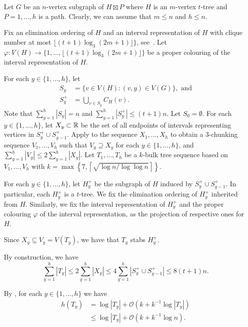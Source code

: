 \documentclass[kpfonts]{patmorin}
\newcommand{\Oh}{\mathcal{O}}
\let\le\leqslant
\let\leq\leqslant
\begin{document}
Let $G$ be an $n$-vertex subgraph of $H\boxtimes P$ where $H$ is an $m$-vertex $t$-tree and $P=1,\ldots,h$ is a path. 
Clearly, we can assume that $m\leq n$ and $h\leq n$.

Fix an elimination ordering of $H$ and 
an interval representation of $H$ with clique number at most $\lfloor(t+1)\log_3 (2m+1)\rfloor\}$, see~. 
Let $\varphi:V(H)\to\{1,\ldots,\lfloor(t+1)\log_3 (2m+1)\rfloor\}$ be a proper colouring of the interval representation of $H$.

For each $y\in\{1,\ldots,h\}$, let 
\begin{align*}
S_y&=\{v\in V(H): (v,y)\in V(G)\}, \text{ and}\\
S^+_y&=\textstyle\bigcup_{v\in S_y} C_H(v).
\end{align*}
Note that $\sum_{y=1}^h |S_y| =n$ and $\sum_{y=1}^h |S^+_y| \leq (t+1)n$.
Let $S_0=\emptyset$. 
For each $y\in\{1,\ldots,h\}$, let $X_y\subset\mathbb{R}$ be the set of all endpoints of intervals representing vertices in $S^+_y\cup S^+_{y-1}$. 
Apply  to the sequence $X_1,\ldots,X_h$ to obtain a $3$-chunking sequence $V_1,\ldots,V_{h}$ such that $V_y\supseteq X_y$ for each $y\in\{1,\ldots,h\}$, and $\sum_{y=1}^h |V_y|\le 2\sum_{y=1}^h |X_y|$.
Let $T_1,\ldots,T_h$ be a $k$-bulk tree sequence based on $V_1,\ldots,V_{h}$ with $k=\max\left\{7,\left\lceil\sqrt{\log n / \log\log n}\right\rceil\right\}$.

For each $y\in\{1,\ldots,h\}$, let $H^+_y$ be the subgraph of $H$ induced by $S^+_y\cup S^+_{y-1}$. 
In particular, each $H^+_y$ is a $t$-tree. 
We fix the elimination ordering of $H^+_y$ inherited from $H$.
Similarly, we fix the interval representation of $H^+_y$ and the proper colouring $\varphi$ of the interval representation, as the projection of respective ones for $H$.

Since $X_y \subseteq V_y = V(T_y)$, we have that $T_y$ stabs $H^+_y$.

By construction, we have
\[
\textstyle\sum_{y=1}^h |T_y| \le 2\textstyle\sum_{y=1}^h |X_y| \le 4\textstyle\sum_{y=1}^h |S^+_y\cup S^+_{y-1}| \le 8(t+1)n.
\]

By , for each $y\in\{1,\ldots,h\}$ we have
\begin{align*}
h(T_y)&= \log |T_y| + \Oh(k+k^{-1}\log |T_y|)\\
&\leq \log |T_y| + \Oh(k+k^{-1}\log n).
\end{align*}
\end{document}
